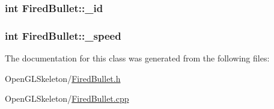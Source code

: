 \subsubsection[{\texorpdfstring{\+\_\+id}{_id}}]{\setlength{\rightskip}{0pt plus 5cm}int Fired\+Bullet\+::\+\_\+id}\hypertarget{class_fired_bullet_aec3fb0f356070b8dfa295b771f8afb2e}{}\label{class_fired_bullet_aec3fb0f356070b8dfa295b771f8afb2e}
\subsubsection[{\texorpdfstring{\+\_\+speed}{_speed}}]{\setlength{\rightskip}{0pt plus 5cm}int Fired\+Bullet\+::\+\_\+speed}\hypertarget{class_fired_bullet_a740fdbda74e1c585cc1771d56d2a9807}{}\label{class_fired_bullet_a740fdbda74e1c585cc1771d56d2a9807}


The documentation for this class was generated from the following files\+:\begin{DoxyCompactItemize}
\item 
Open\+G\+L\+Skeleton/\hyperlink{_fired_bullet_8h}{Fired\+Bullet.\+h}\item 
Open\+G\+L\+Skeleton/\hyperlink{_fired_bullet_8cpp}{Fired\+Bullet.\+cpp}\end{DoxyCompactItemize}
